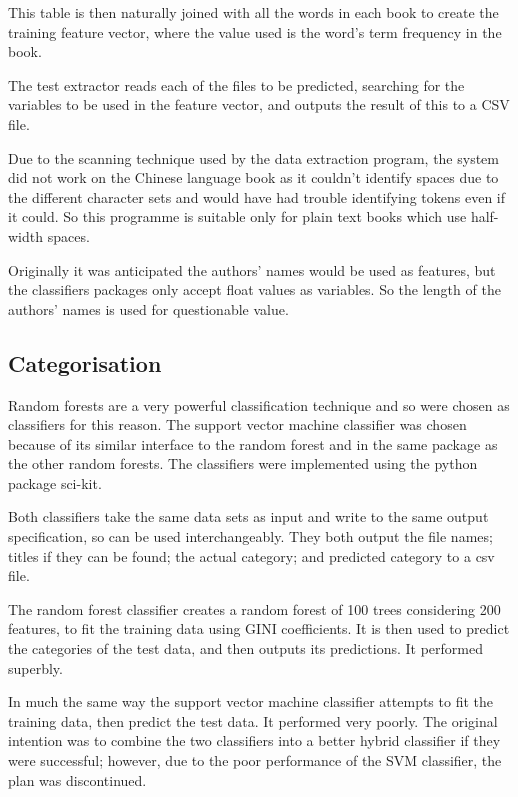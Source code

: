 \documentclass[11pt]{article}
\begin{document}
This table is then naturally joined with all the words in each book to create
the training feature vector, where the value used is the word's term frequency
in the book. 

The test extractor reads each of the files to be predicted, searching for the
variables to be used in the feature vector, and outputs the result of this to a
CSV file.

Due to the scanning technique used by the data extraction program, the system
did not work on the Chinese language book as it couldn't identify spaces due to
the different character sets and would have had trouble identifying tokens even
if it could. So this programme is suitable only for plain text books which use
half-width spaces.

Originally it was anticipated the authors' names would be used as features, but
the classifiers packages only accept float values as variables. So the length of
the authors' names is used for questionable value.

\subsection{Categorisation}

Random forests are a very powerful classification technique and so were chosen
as classifiers for this reason. The support vector machine classifier was chosen
because of its similar interface to the random forest and in the same package as
the other random forests. The classifiers were implemented using the python
package sci-kit.

Both classifiers take the same data sets as input and write to the same output
specification, so can be used interchangeably. They both output the file names;
titles if they can be found; the actual category; and predicted category to a
csv file.

The random forest classifier creates a random forest of 100 trees considering
200 features, to fit the training data using GINI coefficients. It is then used
to predict the categories of the test data, and then outputs its predictions. It
performed superbly.

In much the same way the support vector machine classifier attempts to fit the
training data, then predict the test data. It performed very poorly. The
original intention was to combine the two classifiers into a better hybrid
classifier if they were successful; however, due to the poor performance of the
SVM classifier, the plan was discontinued.
\end{document}
